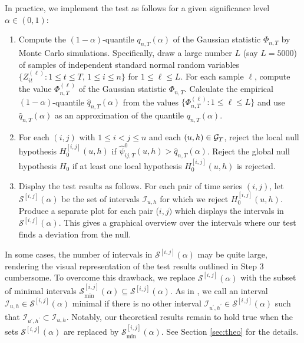 \documentclass[12pt]{article}
\begin{document}
In practice, we implement the test as follows for a given significance level $\alpha \in (0, 1)$:
\begin{enumerate}[label=\textit{Step \arabic*.}, leftmargin=1.45cm,itemsep=0pt,parsep=0pt,topsep=3pt]
\item Compute the $(1-\alpha)$-quantile $q_{n, T}(\alpha)$ of the Gaussian statistic $\Phi_{n,T}$ by Monte Carlo simulations. Specifically, draw a large number $L$ (say $L=5000$) of samples of independent standard normal random variables $\{Z_{it}^{(\ell)} : 1 \le t \le T, \, 1 \le i \le n \}$ for $1 \le \ell \le L$. For each sample $\ell$, compute the value $\Phi_{n,T}^{(\ell)}$ of the Gaussian statistic $\Phi_{n, T}$. Calculate the empirical $(1-\alpha)$-quantile $\widehat{q}_{n, T}(\alpha)$ from the values $\{ \Phi_{n, T}^{(\ell)}: 1 \le \ell \le L \}$ and use $\widehat{q}_{n, T}(\alpha)$ as an approximation of the quantile $q_{n, T}(\alpha)$.
\item For each $(i, j)$ with $1 \le i < j \le n$ and each $(u, h) \in \mathcal{G}_T$, reject the local null hypothesis $H_0^{[i, j]}(u, h)$ if $\widehat{\psi}^0_{ij, T}(u, h)> \widehat{q}_{n, T}(\alpha)$. Reject the global null hypothesis $H_0$ if at least one local hypothesis $H_0^{[i, j]}(u, h)$ is rejected. 
\item Display the test results as follows. For each pair of time series $(i,j)$, let $\mathcal{S}^{[i, j]}(\alpha)$ be the set of intervals $\mathcal{I}_{u, h}$ for which we reject $H_0^{[i, j]}(u, h)$. Produce a separate plot for each pair ($i,j)$ which displays the intervals in $\mathcal{S}^{[i, j]}(\alpha)$. This gives a graphical overview over the intervals where our test finds a deviation from the null. 
\end{enumerate}


\pagebreak
\begin{remark} 
In some cases, the number of intervals in $\mathcal{S}^{[i, j]}(\alpha)$ may be quite large, rendering the visual representation of the test results outlined in Step 3 cumbersome. To overcome this drawback, we replace $\mathcal{S}^{[i, j]}(\alpha)$ with the subset of minimal intervals $\mathcal{S}^{[i, j]}_{\text{min}}(\alpha) \subseteq \mathcal{S}^{[i, j]}(\alpha)$. As in \cite{Duembgen2002}, we call an interval $\mathcal{I}_{u, h} \in \mathcal{S}^{[i, j]}(\alpha)$ minimal if there is no other interval $\mathcal{I}_{u^\prime, h^\prime} \in \mathcal{S}^{[i, j]}(\alpha)$ such that $\mathcal{I}_{u^\prime, h^\prime} \subset \mathcal{I}_{u, h}$. Notably, our theoretical results remain to hold true when the sets $\mathcal{S}^{[i, j]}(\alpha)$ are replaced by $\mathcal{S}^{[i, j]}_{\text{min}}(\alpha)$. See Section \ref{sec:theo} for the details. 
\end{remark}
\end{document}
